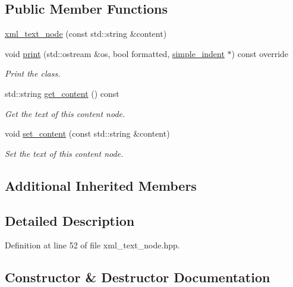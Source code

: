 \subsection*{Public Member Functions}
\begin{DoxyCompactItemize}
\item 
\hyperlink{classxml__text__node_a3d6282cc7416999e361bd7863da9cdca}{xml\+\_\+text\+\_\+node} (const std\+::string \&content)
\item 
void \hyperlink{classxml__text__node_a181163813904b69d93d54030435d5984}{print} (std\+::ostream \&os, bool formatted, \hyperlink{classsimple__indent}{simple\+\_\+indent} $\ast$) const override
\begin{DoxyCompactList}\small\item\em Print the class. \end{DoxyCompactList}\item 
std\+::string \hyperlink{classxml__text__node_afe0c3ab92ada3c4d6326c3150aefaf92}{get\+\_\+content} () const
\begin{DoxyCompactList}\small\item\em Get the text of this content node. \end{DoxyCompactList}\item 
void \hyperlink{classxml__text__node_aa53c22b0aee2377304ebd4bae89f0cad}{set\+\_\+content} (const std\+::string \&content)
\begin{DoxyCompactList}\small\item\em Set the text of this content node. \end{DoxyCompactList}\end{DoxyCompactItemize}
\subsection*{Additional Inherited Members}


\subsection{Detailed Description}


Definition at line 52 of file xml\+\_\+text\+\_\+node.\+hpp.



\subsection{Constructor \& Destructor Documentation}
\mbox{\label{classxml__text__node_a3d6282cc7416999e361bd7863da9cdca}} 
